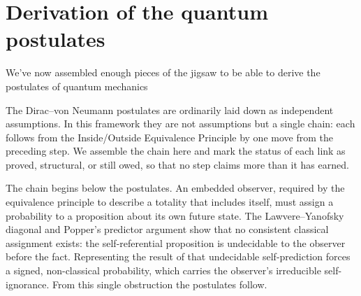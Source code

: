 \documentclass{article}
\begin{document}
\section{Derivation of the quantum postulates}
\label{sec:postulates}
We've now assembled enough pieces of the jigsaw to be able to derive the postulates of quantum mechanics

The Dirac--von Neumann postulates are ordinarily laid down as independent
assumptions. In this framework they are not assumptions but a single chain: each
follows from the Inside/Outside Equivalence Principle by one move from the
preceding step. We assemble the chain here and mark the status of each link as
proved, structural, or still owed, so that no step claims more than it has earned.

The chain begins below the postulates. An embedded observer, required by the
equivalence principle to describe a totality that includes itself, must assign a
probability to a proposition about its own future state. The Lawvere--Yanofsky
diagonal \autocite{Yanofsky2003} and Popper's predictor argument
\autocite{Popper1950a, Popper1950b} show that no consistent classical assignment
exists: the self-referential proposition is undecidable to the observer before
the fact. Representing the result of that undecidable self-prediction forces a
signed, non-classical probability, which carries the observer's irreducible
self-ignorance. From this single obstruction the postulates follow.
\end{document}
